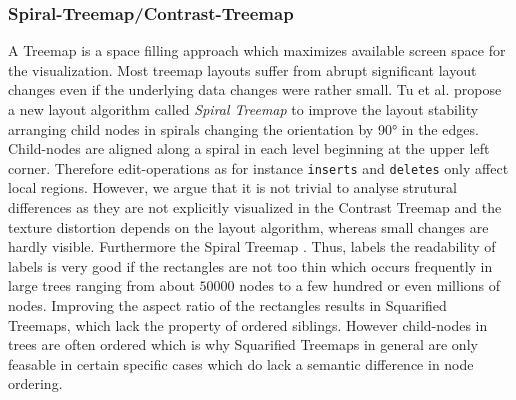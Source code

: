 \subsubsection{Spiral-Treemap/Contrast-Treemap\cite{tu2007visualizing}}
A Treemap is a space filling approach which maximizes available screen space for the visualization. Most treemap layouts suffer from abrupt significant layout changes even if the underlying data changes were rather small. Tu et al. propose a new layout algorithm called \emph{Spiral Treemap} to improve the layout stability arranging child nodes in spirals changing the orientation by 90° in the edges. Child-nodes are aligned along a spiral in each level beginning at the upper left corner. Therefore edit-operations as for instance \texttt\texttt{inserts} and \texttt{deletes} only affect local regions. However, we argue that it is not trivial to analyse strutural differences as they are not explicitly visualized in the Contrast Treemap and the texture distortion depends on the layout algorithm, whereas small changes are hardly visible. Furthermore the Spiral Treemap .   Thus, labels the readability of labels is very good if the rectangles are not too thin which occurs frequently in large trees ranging from about $50000$ nodes to a few hundred or even millions of nodes. Improving the aspect ratio of the rectangles results in Squarified Treemaps\cite{bruls2000squarified}, which lack the property of ordered siblings. However child-nodes in trees are often ordered which is why Squarified Treemaps in general are only feasable in certain specific cases which do lack a semantic difference in node ordering. %

